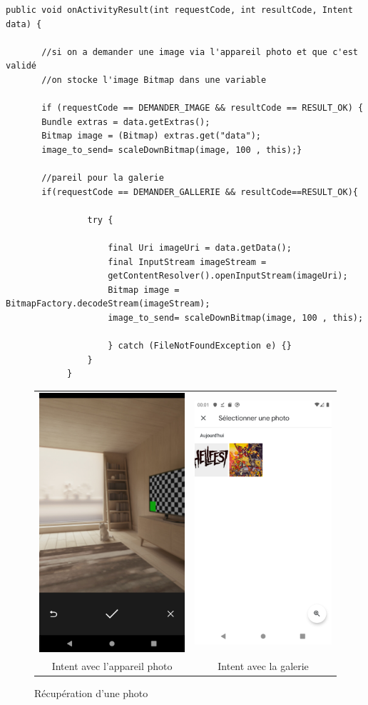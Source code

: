 \documentclass{article}
\begin{document}
\begin{verbatim}
public void onActivityResult(int requestCode, int resultCode, Intent data) {

       //si on a demander une image via l'appareil photo et que c'est validé
       //on stocke l'image Bitmap dans une variable
       
       if (requestCode == DEMANDER_IMAGE && resultCode == RESULT_OK) {
       Bundle extras = data.getExtras();
       Bitmap image = (Bitmap) extras.get("data");
       image_to_send= scaleDownBitmap(image, 100 , this);}

	   //pareil pour la galerie
       if(requestCode == DEMANDER_GALLERIE && resultCode==RESULT_OK){

                try {

                    final Uri imageUri = data.getData();
                    final InputStream imageStream =
                    getContentResolver().openInputStream(imageUri);
                    Bitmap image = BitmapFactory.decodeStream(imageStream);
                    image_to_send= scaleDownBitmap(image, 100 , this);

					} catch (FileNotFoundException e) {}
				}
			}
\end{verbatim}
\begin{figure}[tb]
    \centering
    \begin{tabular}{cc}
      \includegraphics[width=.16\linewidth]{./img/photo_appareil.png} &
      \includegraphics[width=.16\linewidth]{./img/photo_gal.png} \\
      Intent avec l'appareil photo & Intent avec la galerie\\
    \end{tabular}
    \caption{Récupération d'une photo\label{fig:photo}}
\end{figure}
\end{document}
